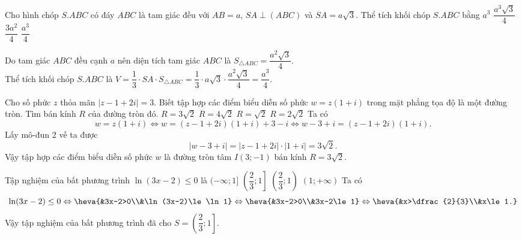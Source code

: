 \begin{ex}%
Cho hình chóp $S.ABC$ có đáy $ABC$ là tam giác đều với $AB=a$, $SA\perp(ABC)$ và $SA=a\sqrt{3}$. Thể tích khối chóp $S.ABC$ bằng
\choice
{$a^3$}
{$\dfrac{a^3\sqrt{3}}{4}$}
{$\dfrac{3a^2}{4}$}
{\True $\dfrac{a^3}{4}$}
\loigiai
{\immini
{Do tam giác $ABC$ đều cạnh $a$ nên diện tích tam giác $ABC$ là $S_{\triangle ABC}=\dfrac{a^2\sqrt{3}}{4}$.\\
Thể tích khối chóp $S.ABC$ là $V=\dfrac{1}{3}\cdot SA\cdot S_{\triangle ABC}=\dfrac{1}{3}\cdot a\sqrt{3}\cdot\dfrac{a^2\sqrt{3}}{4}=\dfrac{a^3}{4}$.
}
{
}
}
\end{ex}

\begin{ex}%
Cho số phức $z$ thỏa mãn $|z-1+2i|=3$. Biết tập hợp các điểm biểu diễn số phức $w=z(1+i)$ trong mặt phẳng tọa độ là một đường tròn. Tìm bán kính $R$ của đường tròn đó.
\choice
{\True $R=3\sqrt{2}$}
{$R=4\sqrt{2}$}
{$R=\sqrt{2}$}
{$R=2\sqrt{2}$}
\loigiai
{Ta có 
\[w=z(1+i)\Leftrightarrow w=(z-1+2i)(1+i)+3-i\Leftrightarrow w-3+i=(z-1+2i)(1+i).\]
Lấy mô-đun 2 vế ta được
\[|w-3+i|=|z-1+2i|\cdot |1+i|=3\sqrt{2}.\]
Vậy tập hợp các điểm biểu diễn số phức $w$ là đường tròn tâm $I(3;-1)$ bán kính $R=3\sqrt{2}$.
}
\end{ex}

\begin{ex}%
Tập nghiệm của bất phương trình $\ln (3x-2)\le 0$ là
\choice
{$(-\infty;1]$}
{\True $\left(\dfrac{2}{3};1\right]$}
{$\left(\dfrac{2}{3};1\right)$}
{$(1;+\infty) $}
\loigiai
{Ta có 
\[\ln (3x-2)\le 0\Leftrightarrow\heva{&3x-2>0\\&\ln (3x-2)\le \ln 1}\Leftrightarrow\heva{&3x-2>0\\&3x-2\le 1}\Leftrightarrow\heva{&x>\dfrac{2}{3}\\&x\le 1.}\]
Vậy tập nghiệm của bất phương trình đã cho $S=\left(\dfrac{2}{3};1\right]$.
}
\end{ex}

